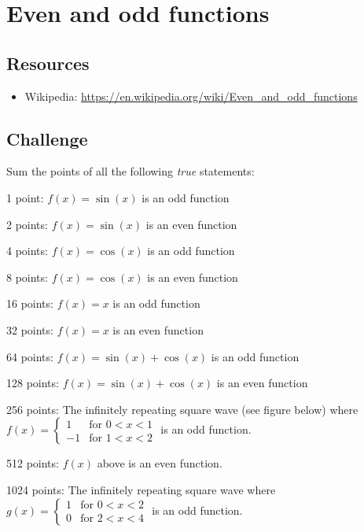 
\section{Even and odd functions}

\subsection*{Resources}
\begin{itemize}
    \item Wikipedia: \url{https://en.wikipedia.org/wiki/Even_and_odd_functions}
\end{itemize}

\subsection*{Challenge}
Sum the points of all the following \emph{true} statements:

1 point: $f(x)=\sin(x)$ is an odd function

2 points: $f(x)=\sin(x)$ is an even function

4 points: $f(x)=\cos(x)$ is an odd function

8 points: $f(x)=\cos(x)$ is an even function

16 points: $f(x)=x$ is an odd function

32 points: $f(x)=x$ is an even function

64 points: $f(x)=\sin(x) + \cos(x)$ is an odd function

128 points: $f(x)=\sin(x) + \cos(x)$ is an even function

256 points: The infinitely repeating square wave (see figure below) where $f(x)=
    \begin{cases}
        1 & \text{for } 0<x<1 \\
        -1 & \text{for } 1<x<2
    \end{cases}$ is an odd function.

512 points: $f(x)$ above is an even function.

1024 points: The infinitely repeating square wave where $g(x)=
    \begin{cases}
        1 & \text{for } 0<x<2 \\
        0 & \text{for } 2<x<4
    \end{cases}$ is an odd function.

